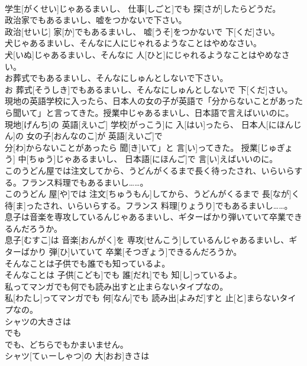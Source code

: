 \documentclass[8pt]{extreport}
\begin{document}
\begin{CJK}{UTF8}{min}
\\	学生[がくせい]じゃあるまいし、 仕事[しごと]でも 探[さが]したらどうだ。
\\	政治家でもあるまいし、嘘をつかないで下さい。	
\\	政治[せいじ] 家[か]でもあるまいし、 嘘[うそ]をつかないで 下[くだ]さい。
\\	犬じゃあるまいし、そんなに人にじゃれるようなことはやめなさい。	
\\	犬[いぬ]じゃあるまいし、そんなに 人[ひと]にじゃれるようなことはやめなさい。
\\	お葬式でもあるまいし、そんなにしゅんとしないで下さい。	
\\	お 葬式[そうしき]でもあるまいし、そんなにしゅんとしないで 下[くだ]さい。
\\	現地の英語学校に入ったら、日本人の女の子が英語で「分からないことがあったら聞いて」と言ってきた。授業中じゃあるまいし、日本語で言えばいいのに。	
\\	現地[げんち]の 英語[えいご] 学校[がっこう]に 入[はい]ったら、 日本人[にほんじん]の 女の子[おんなのこ]が 英語[えいご]で
\\	分[わ]からないことがあったら 聞[き]いて」と 言[い]ってきた。 授業[じゅぎょう] 中[ちゅう]じゃあるまいし、 日本語[にほんご]で 言[い]えばいいのに。
\\	このうどん屋では注文してから、うどんがくるまで長く待ったされ、いらいらする。フランス料理でもあるまいし……。	
\\	このうどん 屋[や]では 注文[ちゅうもん]してから、うどんがくるまで 長[なが]く 待[ま]ったされ、いらいらする。フランス 料理[りょうり]でもあるまいし……。
\\	息子は音楽を専攻しているんじゃあるまいし、ギターばかり弾いていて卒業できるんだろうか。	
\\	息子[むすこ]は 音楽[おんがく]を 専攻[せんこう]しているんじゃあるまいし、ギターばかり 弾[ひ]いていて 卒業[そつぎょう]できるんだろうか。
\\	そんなことは子供でも誰でも知っているよ。	
\\	そんなことは 子供[こども]でも 誰[だれ]でも 知[し]っているよ。
\\	私ってマンガでも何でも読み出すと止まらないタイプなの。	
\\	私[わたし]ってマンガでも 何[なん]でも 読み出[よみだ]すと 止[と]まらないタイプなの。
\\	シャツの大きさは
\\	でも
\\	でも、どちらでもかまいません。	
\\	シャツ[てぃーしゃつ]の 大[おお]きさは 

\end{CJK}
\end{document}
